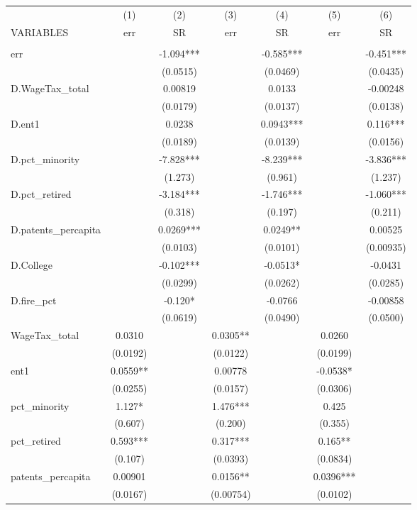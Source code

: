 \begin{tabular}{lcccccc} \hline
 & (1) & (2) & (3) & (4) & (5) & (6) \\
VARIABLES & err & SR & err & SR & err & SR \\ \hline
 &  &  &  &  &  &  \\
err &  & -1.094*** &  & -0.585*** &  & -0.451*** \\
 &  & (0.0515) &  & (0.0469) &  & (0.0435) \\
D.WageTax\_total &  & 0.00819 &  & 0.0133 &  & -0.00248 \\
 &  & (0.0179) &  & (0.0137) &  & (0.0138) \\
D.ent1 &  & 0.0238 &  & 0.0943*** &  & 0.116*** \\
 &  & (0.0189) &  & (0.0139) &  & (0.0156) \\
D.pct\_minority &  & -7.828*** &  & -8.239*** &  & -3.836*** \\
 &  & (1.273) &  & (0.961) &  & (1.237) \\
D.pct\_retired &  & -3.184*** &  & -1.746*** &  & -1.060*** \\
 &  & (0.318) &  & (0.197) &  & (0.211) \\
D.patents\_percapita &  & 0.0269*** &  & 0.0249** &  & 0.00525 \\
 &  & (0.0103) &  & (0.0101) &  & (0.00935) \\
D.College &  & -0.102*** &  & -0.0513* &  & -0.0431 \\
 &  & (0.0299) &  & (0.0262) &  & (0.0285) \\
D.fire\_pct &  & -0.120* &  & -0.0766 &  & -0.00858 \\
 &  & (0.0619) &  & (0.0490) &  & (0.0500) \\
WageTax\_total & 0.0310 &  & 0.0305** &  & 0.0260 &  \\
 & (0.0192) &  & (0.0122) &  & (0.0199) &  \\
ent1 & 0.0559** &  & 0.00778 &  & -0.0538* &  \\
 & (0.0255) &  & (0.0157) &  & (0.0306) &  \\
pct\_minority & 1.127* &  & 1.476*** &  & 0.425 &  \\
 & (0.607) &  & (0.200) &  & (0.355) &  \\
pct\_retired & 0.593*** &  & 0.317*** &  & 0.165** &  \\
 & (0.107) &  & (0.0393) &  & (0.0834) &  \\
patents\_percapita & 0.00901 &  & 0.0156** &  & 0.0396*** &  \\
 & (0.0167) &  & (0.00754) &  & (0.0102) &  \\

\end{tabular}
